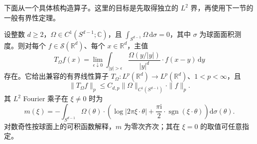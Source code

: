 下面从一个具体核构造算子。这里的目标是先取得独立的 \(L^2\) 界，再使用下一节的一般有界性定理。
\begin{theorem}\label{b2:thm:18-homogeneous-kernel}
设整数 \(d\geq2\)，\(\Omega\in C^1(S^{d-1};\mathbb C)\)，且 \(\int_{S^{d-1}}\Omega\,\mathrm d\sigma=0\)，其中 \(\sigma\) 为球面面积测度。则对每个 \(f\in\mathcal S(\mathbb R^d)\)、每个 \(x\in\mathbb R^d\)，主值
\[
 T_\Omega f(x)=\lim_{\epsilon\downarrow0}
 \int_{|y|>\epsilon}\frac{\Omega(y/|y|)}{|y|^d}\cdot f(x-y)\,\mathrm dy
\]
存在。它给出兼容的有界线性算子 \(T_\Omega:L^p(\mathbb R^d)\to L^p(\mathbb R^d)\)、\(1<p<\infty\)，且
\[
 \|T_\Omega f\|_p\leq C_{d,p}\|\Omega\|_{C^1(S^{d-1})}\cdot\|f\|_p.
\]
其 \(L^2\) Fourier 乘子在 \(\xi\ne0\) 时为
\[
 m(\xi)=-\int_{S^{d-1}}\Omega(\theta)\cdot
 \left(\log|2\pi\xi\cdot\theta|
       +\frac{\pi\mathrm i}{2}\cdot\operatorname{sgn}(\xi\cdot\theta)\right)\mathrm d\sigma(\theta).
\]
对数奇性按球面上的可积函数解释，\(m\) 为零次齐次；其在 \(\xi=0\) 的取值可任意指定。
\end{theorem}

